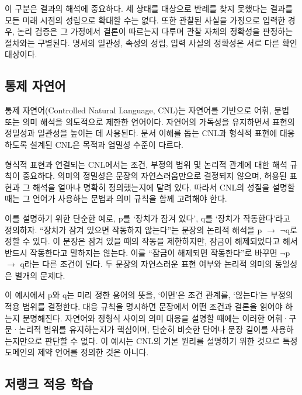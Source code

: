 \documentclass[10pt,a4paper,twocolumn]{article}\usepackage[margin=18mm]{geometry}\usepackage{fontspec,kotex}
\begin{document}
이 구분은 결과의 해석에 중요하다. 세 상태를 대상으로 반례를 찾지 못했다는 결과를 모든 미래 시점의 성립으로 확대할 수는 없다. 또한 관찰된 사실을 가정으로 입력한 경우, 논리 검증은 그 가정에서 결론이 따르는지 다루며 관찰 자체의 정확성을 판정하는 절차와는 구별된다. 명세의 일관성, 속성의 성립, 입력 사실의 정확성은 서로 다른 확인 대상이다.\par

\subsection{통제 자연어}

통제 자연어(Controlled Natural Language, CNL)는 자연어를 기반으로 어휘, 문법 또는 의미 해석을 의도적으로 제한한 언어이다. 자연어의 가독성을 유지하면서 표현의 정밀성과 일관성을 높이는 데 사용된다. 문서 이해를 돕는 CNL과 형식적 표현에 대응하도록 설계된 CNL은 목적과 엄밀성 수준이 다르다. \cite{r13}\par

형식적 표현과 연결되는 CNL에서는 조건, 부정의 범위 및 논리적 관계에 대한 해석 규칙이 중요하다. 의미의 정밀성은 문장의 자연스러움만으로 결정되지 않으며, 허용된 표현과 그 해석을 얼마나 명확히 정의했는지에 달려 있다. 따라서 CNL의 성질을 설명할 때는 그 언어가 사용하는 문법과 의미 규칙을 함께 고려해야 한다. \cite{r13}\par

이를 설명하기 위한 단순한 예로, p를 ‘장치가 잠겨 있다’, q를 ‘장치가 작동한다’라고 정의하자. “장치가 잠겨 있으면 작동하지 않는다”는 문장의 논리적 해석을 p \ensuremath{\rightarrow} \ensuremath{\neg}q로 정할 수 있다. 이 문장은 잠겨 있을 때의 작동을 제한하지만, 잠금이 해제되었다고 해서 반드시 작동한다고 말하지는 않는다. 이를 “잠금이 해제되면 작동한다”로 바꾸면 \ensuremath{\neg}p \ensuremath{\rightarrow} q라는 다른 조건이 된다. 두 문장의 자연스러운 표현 여부와 논리적 의미의 동일성은 별개의 문제다.\par

이 예시에서 p와 q는 미리 정한 용어의 뜻을, ‘이면’은 조건 관계를, ‘않는다’는 부정의 적용 범위를 결정한다. 대응 규칙을 명시하면 문장에서 어떤 조건과 결론을 읽어야 하는지 분명해진다. 자연어와 정형식 사이의 의미 대응을 설명할 때에는 이러한 어휘·구문·논리적 범위를 유지하는지가 핵심이며, 단순히 비슷한 단어나 문장 길이를 사용하는지만으로 판단할 수 없다. 이 예시는 CNL의 기본 원리를 설명하기 위한 것으로 특정 도메인의 제약 언어를 정의한 것은 아니다.\par

\subsection{저랭크 적응 학습}
\end{document}

